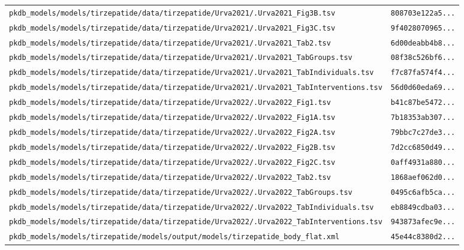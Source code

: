 \documentclass{article}
\begin{document}
\begin{longtable}{ll}
\texttt{pkdb\_models/models/tirzepatide/data/tirzepatide/Urva2021/.Urva2021\_Fig3B.tsv} & \texttt{808703e122a5...} \\
\texttt{pkdb\_models/models/tirzepatide/data/tirzepatide/Urva2021/.Urva2021\_Fig3C.tsv} & \texttt{9f4028070965...} \\
\texttt{pkdb\_models/models/tirzepatide/data/tirzepatide/Urva2021/.Urva2021\_Tab2.tsv} & \texttt{6d00deabb4b8...} \\
\texttt{pkdb\_models/models/tirzepatide/data/tirzepatide/Urva2021/.Urva2021\_TabGroups.tsv} & \texttt{08f38c526bf6...} \\
\texttt{pkdb\_models/models/tirzepatide/data/tirzepatide/Urva2021/.Urva2021\_TabIndividuals.tsv} & \texttt{f7c87fa574f4...} \\
\texttt{pkdb\_models/models/tirzepatide/data/tirzepatide/Urva2021/.Urva2021\_TabInterventions.tsv} & \texttt{56d0d60eda69...} \\
\texttt{pkdb\_models/models/tirzepatide/data/tirzepatide/Urva2022/.Urva2022\_Fig1.tsv} & \texttt{b41c87be5472...} \\
\texttt{pkdb\_models/models/tirzepatide/data/tirzepatide/Urva2022/.Urva2022\_Fig1A.tsv} & \texttt{7b18353ab307...} \\
\texttt{pkdb\_models/models/tirzepatide/data/tirzepatide/Urva2022/.Urva2022\_Fig2A.tsv} & \texttt{79bbc7c27de3...} \\
\texttt{pkdb\_models/models/tirzepatide/data/tirzepatide/Urva2022/.Urva2022\_Fig2B.tsv} & \texttt{7d2cc6850d49...} \\
\texttt{pkdb\_models/models/tirzepatide/data/tirzepatide/Urva2022/.Urva2022\_Fig2C.tsv} & \texttt{0aff4931a880...} \\
\texttt{pkdb\_models/models/tirzepatide/data/tirzepatide/Urva2022/.Urva2022\_Tab2.tsv} & \texttt{1868aef062d0...} \\
\texttt{pkdb\_models/models/tirzepatide/data/tirzepatide/Urva2022/.Urva2022\_TabGroups.tsv} & \texttt{0495c6afb5ca...} \\
\texttt{pkdb\_models/models/tirzepatide/data/tirzepatide/Urva2022/.Urva2022\_TabIndividuals.tsv} & \texttt{eb8849cdba03...} \\
\texttt{pkdb\_models/models/tirzepatide/data/tirzepatide/Urva2022/.Urva2022\_TabInterventions.tsv} & \texttt{943873afec9e...} \\
\texttt{pkdb\_models/models/tirzepatide/models/output/models/tirzepatide\_body\_flat.xml} & \texttt{45e44c8380d2...} \\
\end{longtable}
\end{document}
